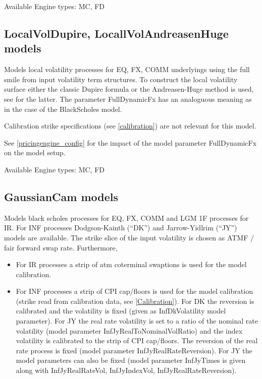 \smallskip
Available Engine types: MC, FD

\subsection{LocalVolDupire, LocallVolAndreasenHuge models}

Models local volatility processes for EQ, FX, COMM underlyings using the full smile from input volatility term
structures. To construct the local volatility surface either the classic Dupire formula or the Andreasen-Huge method is
used, see \cite{andreasen_huge_localvol} for the latter. The parameter FullDynamicFx has an analoguous meaning as in the
case of the BlackScholes model.

Calibration strike specifications (see \ref{calibration}) are not relevant for this model.

See \ref{pricingengine_config} for the impact of the model parameter FullDynamicFx on the model setup.

\smallskip
Available Engine types: MC, FD

\subsection{GaussianCam models}

Models black scholes processes for EQ, FX, COMM and LGM 1F processes for IR. For INF processes Dodgson-Kainth (``DK'')
and Jarrow-Yidlrim (``JY'') models are available. The strike slice of the input volatility is chosen as ATMF / fair
forward swap rate. Furthermore,

\begin{itemize}
\item For IR processes a strip of atm coterminal swaptions is used for the model calibration.
\item For INF processes a strip of CPI cap/floors is used for the model calibration (strike read from calibration data,
  see \ref{Calibration}). For DK the reversion is calibrated and the volatility is fixed (given as InfDkVolatility model
  parameter). For JY the real rate volatility is set to a ratio of the nominal rate volatility (model parameter
  InfJyRealToNominalVolRatio) and the index volatility is calibrated to the strip of CPI cap/floors. The reversion of
  the real rate process is fixed (model parameter InfJyRealRateReversion). For JY the model parameters can also be fixed
  (model parameter InfJyTimes is given along with InfJyRealRateVol, InfJyIndexVol, InfJyRealRateReversion).
\end{itemize}

